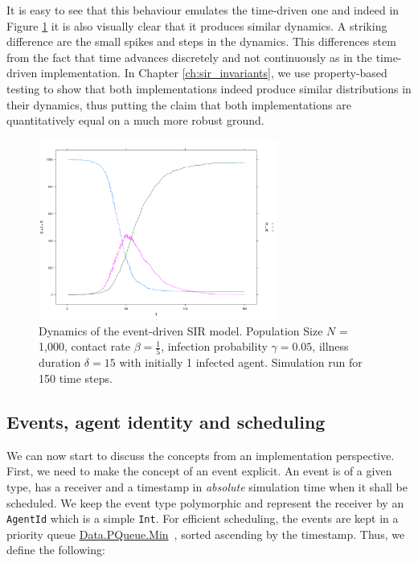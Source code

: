 \medskip

It is easy to see that this behaviour emulates the time-driven one and indeed in Figure \ref{fig:sir_eventdriven_dynamics} it is also visually clear that it produces similar dynamics. A striking difference are the small spikes and steps in the dynamics. This differences stem from the fact that time advances discretely and not continuously as in the time-driven implementation. In Chapter \ref{ch:sir_invariants}, we use property-based testing to show that both implementations indeed produce similar distributions in their dynamics, thus putting the claim that both implementations are quantitatively equal on a much more robust ground.

\begin{figure}
	\centering
	\includegraphics[width=0.7\textwidth, angle=0]{./fig/eventdriven/sir_eventdriven.png}
	\caption[Dynamics of the event-driven SIR model]{Dynamics of the event-driven SIR model. Population Size $N$ = 1,000, contact rate $\beta = \frac{1}{5}$, infection probability $\gamma = 0.05$, illness duration $\delta = 15$ with initially 1 infected agent. Simulation run for 150 time steps.}
	\label{fig:sir_eventdriven_dynamics}
\end{figure}

\subsection{Events, agent identity and scheduling}
We can now start to discuss the concepts from an implementation perspective. First, we need to make the concept of an event explicit. An event is of a given type, has a receiver and a timestamp in \textit{absolute} simulation time when it shall be scheduled. We keep the event type polymorphic and represent the receiver by an \texttt{AgentId} which is a simple \texttt{Int}. For efficient scheduling, the events are kept in a priority queue \href{http://hackage.haskell.org/package/pqueue}{Data.PQueue.Min}~\cite{pqueue_library}, sorted ascending by the timestamp. Thus, we define the following:

